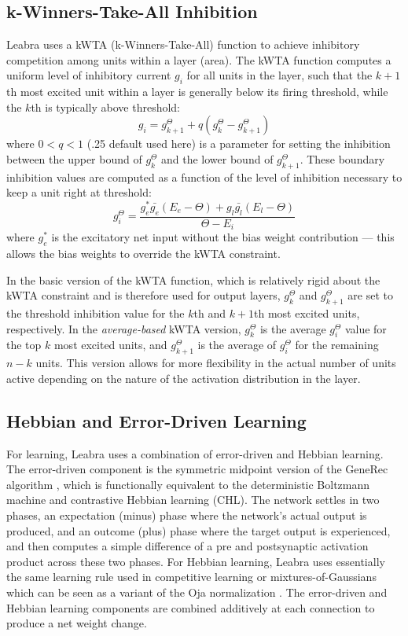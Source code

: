 \subsection{k-Winners-Take-All Inhibition}

Leabra uses a kWTA (k-Winners-Take-All) function to achieve inhibitory
competition among units within a layer (area).  The kWTA function
computes a uniform level of inhibitory current $g_i$ for all units in
the layer, such that the $k+1$th most excited unit within a layer is
generally below its firing threshold, while the $k$th is typically
above threshold:
\begin{equation}
  g_i = g^{\Theta}_{k+1} + q (g^{\Theta}_k - g^{\Theta}_{k+1})
  \label{eq.g_i}
\end{equation}
where $0<q<1$ (.25 default used here) is a parameter for setting the
inhibition between the upper bound of $g^{\Theta}_k$ and the lower
bound of $g^{\Theta}_{k+1}$.  These boundary inhibition values are
computed as a function of the level of inhibition necessary to keep a
unit right at threshold:
\begin{equation}
  g_i^{\Theta} = \frac{g^*_e \bar{g_e} (E_e - \Theta) +
    g_l \bar{g_l} (E_l - \Theta)}{\Theta - E_i}
  \label{eq.i_at_thr}
\end{equation}
where $g^*_e$ is the excitatory net input without the bias weight
contribution --- this allows the bias weights to override the kWTA
constraint.

In the basic version of the kWTA function, which is relatively rigid
about the kWTA constraint and is therefore used for output layers,
$g^{\Theta}_k$ and $g^{\Theta}_{k+1}$ are set to the threshold
inhibition value for the $k$th and $k+1$th most excited units,
respectively.  In the {\em average-based} kWTA version, $g^{\Theta}_k$
is the average $g_i^{\Theta}$ value for the top $k$ most excited
units, and $g^{\Theta}_{k+1}$ is the average of $g_i^{\Theta}$ for the
remaining $n-k$ units.  This version allows for more flexibility in
the actual number of units active depending on the nature of the
activation distribution in the layer.

\subsection{Hebbian and Error-Driven Learning} 

For learning, Leabra uses a combination of error-driven and Hebbian
learning.  The error-driven component is the symmetric midpoint
version of the GeneRec algorithm \cite{OReilly96}, which is
functionally equivalent to the deterministic Boltzmann machine and
contrastive Hebbian learning (CHL).  The network settles in two
phases, an expectation (minus) phase where the network's actual output
is produced, and an outcome (plus) phase where the target output is
experienced, and then computes a simple difference of a pre and
postsynaptic activation product across these two phases.  For Hebbian
learning, Leabra uses essentially the same learning rule used in
competitive learning or mixtures-of-Gaussians which can be seen as a
variant of the Oja normalization \cite{Oja82}.  The error-driven and
Hebbian learning components are combined additively at each connection
to produce a net weight change.

